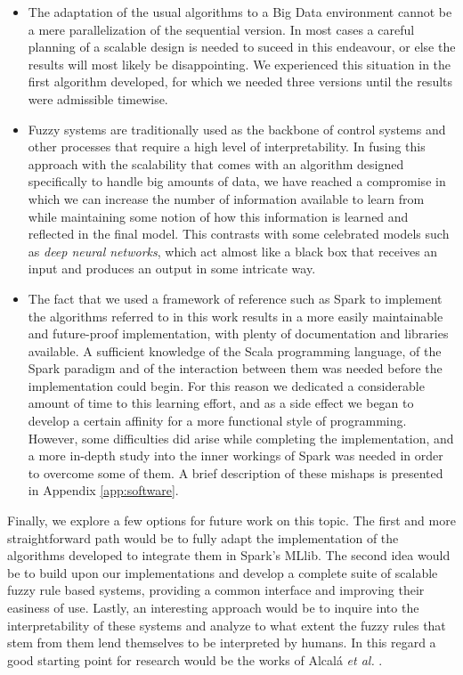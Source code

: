 \begin{itemize}
  \item The adaptation of the usual algorithms to a Big Data environment cannot be a mere parallelization of the sequential version. In most cases a careful planning of a scalable design is needed to suceed in this endeavour, or else the results will most likely be disappointing. We experienced this situation in the first algorithm developed, for which we needed three versions until the results were admissible timewise.
  \item Fuzzy systems are traditionally used as the backbone of control systems and other processes that require a high level of interpretability. In fusing this approach with the scalability that comes with an algorithm designed specifically to handle big amounts of data, we have reached a compromise in which we can increase the number of information available to learn from while maintaining some notion of how this information is learned and reflected in the final model. This contrasts with some celebrated models such as \textit{deep neural networks}, which act almost like a black box that receives an input and produces an output in some intricate way.
  \item The fact that we used a framework of reference such as Spark to implement the algorithms referred to in this work results in a more easily maintainable and future-proof implementation, with plenty of documentation and libraries available. A sufficient knowledge of the Scala programming language, of the Spark paradigm and of the interaction between them was needed before the implementation could begin. For this reason we dedicated a considerable amount of time to this learning effort, and as a side effect we began to develop a certain affinity for a more functional style of programming. However, some difficulties did arise while completing the implementation, and a more in-depth study into the inner workings of Spark was needed in order to overcome some of them. A brief description of these mishaps is presented in Appendix \ref{app:software}.
\end{itemize}

Finally, we explore a few options for future work on this topic. The first and more straightforward path would be to fully adapt the implementation of the algorithms developed to integrate them in Spark's MLlib. The second idea would be to build upon our implementations and develop a complete suite of scalable fuzzy rule based systems, providing a common interface and improving their easiness of use. Lastly, an interesting approach would be to inquire into the interpretability of these systems and analyze to what extent the fuzzy rules that stem from them lend themselves to be interpreted by humans. In this regard a good starting point for research would be the works of Alcalá \textit{et al.} \cite{hybrid2006alcala,gacto2011interpretability}.
